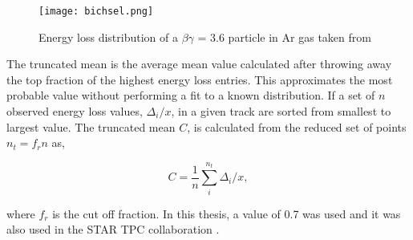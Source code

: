 \begin{figure}
\texttt{[image: bichsel.png]}
\caption{Energy loss distribution of a $\beta\gamma$ = 3.6 particle in Ar gas taken from \cite{bichsel}}
\label{fig:straggling}
\end{figure}

The truncated mean is the average mean value calculated after throwing away the top fraction of the highest energy loss entries. This approximates the most probable value without performing a fit to a known distribution. If a set of $n$ observed energy loss values, $\Delta_i/x$, in a given track are sorted from smallest to largest value. The truncated mean $C$, is calculated from the reduced set of points $n_t = f_r n$ as,

\begin{equation}
C = \frac{1}{n} \sum\limits_{i}^{n_t} \Delta_i/x,
\label{eq:truncmean}
\end{equation}

where $f_r$ is the cut off fraction. In this thesis, a value of 0.7 was used and it was also used in the STAR TPC collaboration \cite{starsyst}. 








